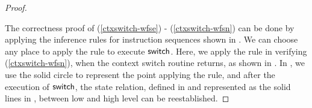 \begin{proof}
    \begin{center}
        
        \vspace*{-0.5em}
        \label{fig:refinement reasoning}
    \end{center}

    The correctness proof of
    (\ref{ctxswitch-wfse}) - (\ref{ctxswitch-wfsn})
    can be done by applying the inference rules for
    instruction sequences shown in
    \Fig{\ref{fig:Selected Inference Rules for Refinement Verification}}.
    We can choose any place to apply the 
     rule to execute $\mathsf{switch}$.
    Here, we apply the  rule
    in verifying
    \SwitchNewTask{} (\ref{ctxswitch-wfsn}),
    when the context switch routine returns,
    as shown in \Fig{\ref{fig:refinement reasoning}}.
    In \Fig{\ref{fig:refinement reasoning}}, we use the
    solid circle to represent the point applying the  rule,
    and after the execution of $\mathsf{switch}$, the
    state relation, defined in \Subsec{\ref{subsec:correctness-primitive}} 
    and represented as the solid lines in \Fig{\ref{fig:refinement reasoning}},
    between low and high level can
    be reestablished.
\end{proof}

